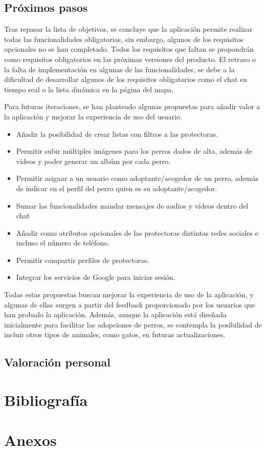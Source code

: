 \documentclass[a4paper, 12pt]{article}
\begin{document}
\subsection{Próximos pasos}

Tras repasar la lista de objetivos, se concluye que la aplicación permite realizar todas las funcionalidades obligatorias, sin embargo, algunos de los requisitos opcionales no se han completado. Todos los requisitos que faltan se propondrán como requisitos obligatorios en las próximas versiones del producto. El retraso o la falta de implementación en algunas de las funcionalidades, se debe a la dificultad de desarrollar algunos de los requisitos obligatorios como el chat en tiempo real o la lista dinámica en la página del mapa.

Para futuras iteraciones, se han planteado algunas propuestas para añadir valor a la aplicación y mejorar la experiencia de uso del usuario.

\begin{itemize}[noitemsep]
	\item Añadir la posibilidad de crear listas con filtros a las protectoras.
	\item Permitir subir múltiples imágenes para los perros dados de alta, además de vídeos y poder generar un albúm por cada perro.
	\item Permitir asignar a un usuario como adoptante/acogedor de un perro, además de indicar en el perfil del perro quien es su adoptante/acogedor.
	\item Sumar las funcionalidades mandar mensajes de audios y vídeos dentro del chat
	\item Añadir como atributos opcionales de las protectoras distintas redes sociales e incluso el número de teléfono.
	\item Permitir compartir perfiles de protectoras.
	\item Integrar los servicios de Google para iniciar sesión.
\end{itemize}

Todas estas propuestas buscan mejorar la experiencia de uso de la aplicación, y algunas de ellas surgen a partir del feedback proporcionado por los usuarios que han probado la aplicación. Además, aunque la aplicación está diseñada inicialmente para facilitar las adopciones de perros, se contempla la posibilidad de incluir otros tipos de animales, como gatos, en futuras actualizaciones.

\subsection{Valoración personal}


\newpage
\section{Bibliografía}


\newpage
\section{Anexos}

\printindex
\end{document}
